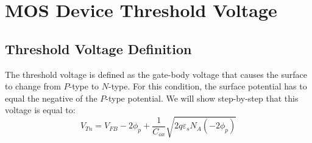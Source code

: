 \section{MOS Device Threshold Voltage}
\subsection{Threshold Voltage Definition}
The threshold voltage is defined as the gate-body voltage that causes the surface to change from $P$-type to $N$-type.   For this condition, the surface potential has to equal the negative of the $P$-type potential.  We will show step-by-step that this voltage is equal to:
    \begin{equation}
        {V_{Tn}} = {V_{FB}} - 2{\phi _p} + \frac{1}{{{C_{ox}}}}\sqrt {2q{\varepsilon _s}{N_A}( - 2{\phi _p})} 
    \end{equation}
